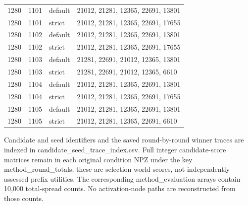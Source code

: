 \begin{longtable}{rrll}
1280 & 1101 & default & 21012, 21281, 12365, 22691, 13801 \\
1280 & 1101 & strict & 21012, 21281, 12365, 22691, 17655 \\
1280 & 1102 & default & 21012, 21281, 12365, 22691, 13801 \\
1280 & 1102 & strict & 21012, 21281, 12365, 22691, 17655 \\
1280 & 1103 & default & 21281, 22691, 21012, 12365, 13801 \\
1280 & 1103 & strict & 21281, 22691, 21012, 12365, 6610 \\
1280 & 1104 & default & 21012, 21281, 12365, 22691, 13801 \\
1280 & 1104 & strict & 21012, 21281, 12365, 22691, 17655 \\
1280 & 1105 & default & 21012, 21281, 12365, 22691, 13801 \\
1280 & 1105 & strict & 21012, 21281, 12365, 22691, 6610 \\
\bottomrule\end{longtable}
Candidate and seed identifiers and the saved round-by-round winner traces are indexed in candidate\_seed\_trace\_index.csv. Full integer candidate-score matrices remain in each original condition NPZ under the key method\_round\_totals; these are selection-world scores, not independently assessed prefix utilities. The corresponding method\_evaluation arrays contain 10,000 total-spread counts. No activation-node paths are reconstructed from those counts.